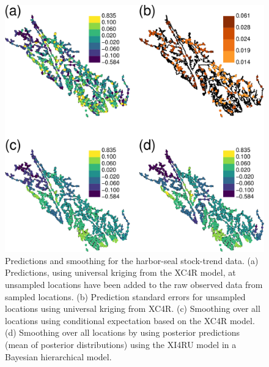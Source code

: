 \documentclass[11pt, titlepage]{article}\usepackage[]{graphicx}\usepackage[]{color}
\begin{document}
\begin{spacing}{1.9}
\begin{flushleft}
\begin{figure}[H]
  \begin{center}
  \includegraphics[width=\linewidth]{figure/Fig-PredSmoo.png}
  \end{center}
  \caption{Predictions and smoothing for the harbor-seal stock-trend data. (a) Predictions, using universal kriging from the XC4R model, at unsampled locations have been added to the raw observed data from sampled locations. (b) Prediction standard errors for unsampled locations using universal kriging from XC4R. (c) Smoothing over all locations using conditional expectation based on the XC4R model.  (d) Smoothing over all locations by using posterior predictions (mean of posterior distributions) using the XI4RU model in a Bayesian hierarchical model.  \label{Fig-PredSmoo}}     
\end{figure}





\end{flushleft}
\end{spacing}
\end{document}
